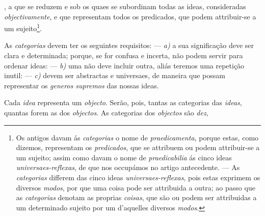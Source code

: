 , a que se reduzem e sob os quaes se subordinam todas as ideas, consideradas \emph{objectivamente}, e que representam todos os predicados, que podem attribuir-se a um sujeito\footnote{Os antigos davam ás \emph{categorias} o nome de \emph{praedicamenta}, porque estas, como dizemos, representam os \emph{predicados}, que se attribuem ou podem attribuir-se a um sujeito; assim como davam o nome de \emph{praedicabilia} ás cinco ideas \emph{universaes-reflexas}, de que nos occupámos no artigo antecedente. --- As \emph{categorias} differem das cinco ideas \emph{universaes-reflexas}, pois estas exprimem os diversos \emph{modos}, por que uma coisa pode ser attribuida a outra; ao passo que as \emph{categorias} denotam as proprias \emph{coisas}, que são ou podem ser attribuidas a um determinado sujeito por um d'aquelles diversos \emph{modos}.}.


As \emph{categorias} devem ter os seguintes requisitos: --- \emph{a)} a sua significação deve ser clara e determinada; porque, se for confusa e incerta, não podem servir para ordenar ideas: --- \emph{b)} uma não deve incluir outra, aliás teremos uma repetição inutil: --- \emph{c)} devem ser abstractas e universaes, de maneira que possam representar os \emph{generos supremos} das nossas ideas.


Cada \emph{idea} representa um \emph{objecto}. Serão, pois, tantas as categorias das \emph{ideas}, quantas forem as dos \emph{objectos}. As categorias dos \emph{objectos} são \emph{dez},


